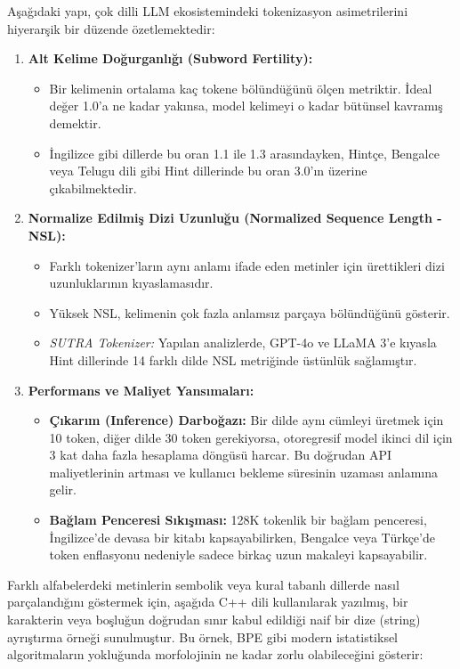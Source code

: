 \documentclass[11pt,a4paper]{article}
\begin{document}
Aşağıdaki yapı, çok dilli LLM ekosistemindeki tokenizasyon asimetrilerini hiyerarşik bir düzende özetlemektedir:

\begin{enumerate}
  \item \textbf{Alt Kelime Doğurganlığı (Subword Fertility):}
\begin{itemize}
  \item Bir kelimenin ortalama kaç tokene bölündüğünü ölçen metriktir. İdeal değer 1.0'a ne kadar yakınsa, model kelimeyi o kadar bütünsel kavramış demektir.
  \item İngilizce gibi dillerde bu oran 1.1 ile 1.3 arasındayken, Hintçe, Bengalce veya Telugu dili gibi Hint dillerinde bu oran 3.0'ın üzerine çıkabilmektedir.
\end{itemize}
  \item \textbf{Normalize Edilmiş Dizi Uzunluğu (Normalized Sequence Length - NSL):}
\begin{itemize}
  \item Farklı tokenizer'ların aynı anlamı ifade eden metinler için ürettikleri dizi uzunluklarının kıyaslamasıdır.
  \item Yüksek NSL, kelimenin çok fazla anlamsız parçaya bölündüğünü gösterir.
  \item \textit{SUTRA Tokenizer:} Yapılan analizlerde, GPT-4o ve LLaMA 3'e kıyasla Hint dillerinde 14 farklı dilde NSL metriğinde üstünlük sağlamıştır.
\end{itemize}
  \item \textbf{Performans ve Maliyet Yansımaları:}
\begin{itemize}
  \item \textbf{Çıkarım (Inference) Darboğazı:} Bir dilde aynı cümleyi üretmek için 10 token, diğer dilde 30 token gerekiyorsa, otoregresif model ikinci dil için 3 kat daha fazla hesaplama döngüsü harcar. Bu doğrudan API maliyetlerinin artması ve kullanıcı bekleme süresinin uzaması anlamına gelir.
  \item \textbf{Bağlam Penceresi Sıkışması:} 128K tokenlik bir bağlam penceresi, İngilizce'de devasa bir kitabı kapsayabilirken, Bengalce veya Türkçe'de token enflasyonu nedeniyle sadece birkaç uzun makaleyi kapsayabilir.
\end{itemize}
\end{enumerate}
Farklı alfabelerdeki metinlerin sembolik veya kural tabanlı dillerde nasıl parçalandığını göstermek için, aşağıda C++ dili kullanılarak yazılmış, bir karakterin veya boşluğun doğrudan sınır kabul edildiği naif bir dize (string) ayrıştırma örneği sunulmuştur. Bu örnek, BPE gibi modern istatistiksel algoritmaların yokluğunda morfolojinin ne kadar zorlu olabileceğini gösterir:
\end{document}
